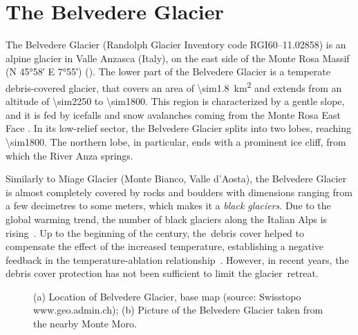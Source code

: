 \section{The Belvedere Glacier}\label{sec:1:belvedereglacier}

The Belvedere Glacier (Randolph Glacier Inventory code RGI60--11.02858) is an alpine
glacier in Valle Anzasca (Italy), on the east side of the Monte Rosa Massif (N
\ang{45;58} E \ang{7;55}) ().
The lower part of the Belvedere Glacier is a temperate debris-covered glacier, that
covers an area of
\SI{\sim1.8}{\kilo\meter\squared} and extends from an altitude of \SI{\sim2250}{\masl} to
\SI{\sim1800}{\masl}.
This region is characterized by a gentle slope, and it is fed by icefalls and snow
avalanches coming from the Monte Rosa East Face \citep{Haeberli2002}. 
In its low-relief
sector, the Belvedere Glacier splits into two lobes, reaching \SI{\sim1800}{\masl}.
The northern lobe, in particular, ends with a prominent ice cliff, from which the River
Anza springs.

Similarly to Miage Glacier (Monte Bianco, Valle d’Aosta), the Belvedere Glacier is almost
completely covered by rocks and boulders with dimensions ranging from a few decimetres to
some meters, which makes it a \textit{black glaciers}.
Due to the global warming trend, the number of black glaciers along the Italian Alps is
rising~\citep{Diolaiuti2003}.
Up to the beginning of the century, the~debris cover helped to compensate the effect of
the increased temperature, establishing a negative feedback in the temperature-ablation
relationship~\citep{Roethlisberger1985,Diolaiuti2003}.
However, in recent years, the debris cover protection has not been sufficient to limit
the glacier~retreat.

\begin{figure}
    \centering
    \caption{(a) Location of Belvedere Glacier, base map (source: Swisstopo
        www.geo.admin.ch); (b) Picture of the Belvedere Glacier taken from the nearby Monte Moro.}
    \label{fig:1:studyarea}
\end{figure}

